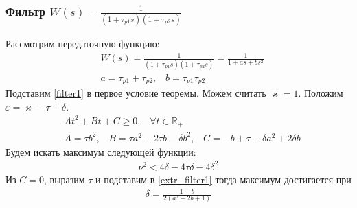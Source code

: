 \documentclass{beamer}
\begin{document}

\begin{frame}
\frametitle{Фильтр $W(s) = \frac{1}{(1+\tau_{p1}s)(1+\tau_{p2}s)}$}
Рассмотрим передаточную функцию:
 \begin{equation}\label{filter1}
 \begin{aligned}
&W(s) = \frac{1}{(1+\tau_{p1}s)(1+\tau_{p2}s)} = \frac{1}{1+as + bs^2}\\
&a = \tau_{p1}+\tau_{p2} \text{,} \quad b = \tau_{p1}\tau_{p2}
 \end{aligned}
\end{equation}
Подставим \eqref{filter1} в первое условие теоремы. Можем считать $\varkappa = 1$. Положим $\varepsilon = \varkappa - \tau - \delta$.
\begin{equation}
 \begin{aligned}
&At^2 + Bt+C \geq 0 \text{,}\quad \forall t \in \mathbb{R_+}\\
&A = \tau b^2 \text{,} \quad B = \tau a^2-2 \tau b - \delta b^2 \text{,} \quad C = - b+\tau-\delta a^2 + 2\delta b
 \end{aligned}
\end{equation}
Будем искать максимум следующей функции: 
\begin{equation}\label{extr_filter1}
 \begin{aligned}
\nu^2 < 4\delta-4\tau\delta - 4\delta^2
 \end{aligned}
\end{equation} 
Из $C = 0$, выразим $\tau$ и подставим в \eqref{extr_filter1} тогда максимум достигается при 
\begin{equation}
 \begin{aligned}
\delta = \frac{1-b}{2(a^2 - 2b + 1)}
 \end{aligned}
\end{equation}
\end{frame}
\end{document}
